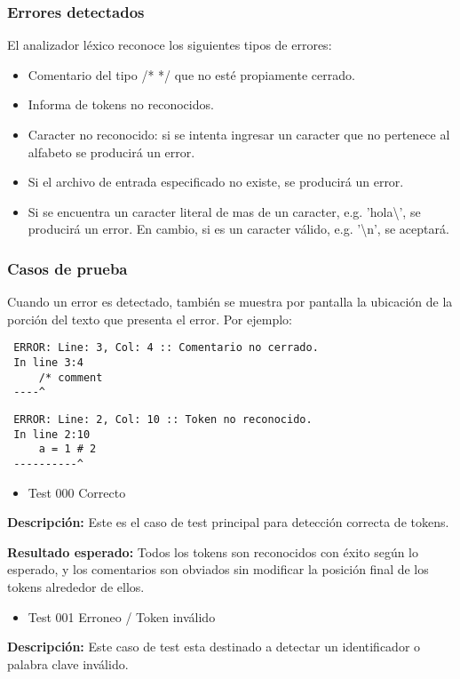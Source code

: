 \documentclass [a4paper,abstracton,titlepage]{scrartcl}
\begin{document}
\subsubsection{Errores detectados}
\label{_errores_detectados}
El analizador léxico reconoce los siguientes tipos de errores:
  \begin{itemize}
\item%
Comentario del tipo /* */ que no esté propiamente cerrado.

\item%
Informa de tokens no reconocidos.

\item%
Caracter no reconocido: si se intenta ingresar un caracter que no pertenece al alfabeto se producirá un error.

\item%
Si el archivo de entrada especificado no existe, se producirá un error.

\item%
Si se encuentra un caracter literal de mas de un caracter, e.g. 'hola\textbackslash{}', se producirá un error. En cambio, si es un caracter válido, e.g. '\textbackslash{}n', se aceptará.

\end{itemize}
\hypertarget{_casos_de_prueba}{}
\subsubsection{Casos de prueba}
\label{_casos_de_prueba}
Cuando un error es detectado, también se muestra por pantalla la
ubicación de la porción del texto que presenta el error. Por ejemplo:
\begin{lstlisting} ERROR: Line: 3, Col: 4 :: Comentario no cerrado.
 In line 3:4
     /* comment
 ----^\end{lstlisting}

\begin{lstlisting} ERROR: Line: 2, Col: 10 :: Token no reconocido.
 In line 2:10
     a = 1 # 2
 ----------^\end{lstlisting}

  \begin{itemize}
\item%
Test 000 Correcto

\end{itemize}
\textbf{Descripción:} Este es el caso de test principal para detección correcta de tokens.

\textbf{Resultado esperado:} Todos los tokens son reconocidos con éxito según lo esperado, y los comentarios son obviados sin modificar la posición final de los tokens alrededor de ellos.
  \begin{itemize}
\item%
Test 001 Erroneo / Token inválido

\end{itemize}
\textbf{Descripción:} Este caso de test esta destinado a detectar un identificador o palabra clave inválido.
\end{document}
